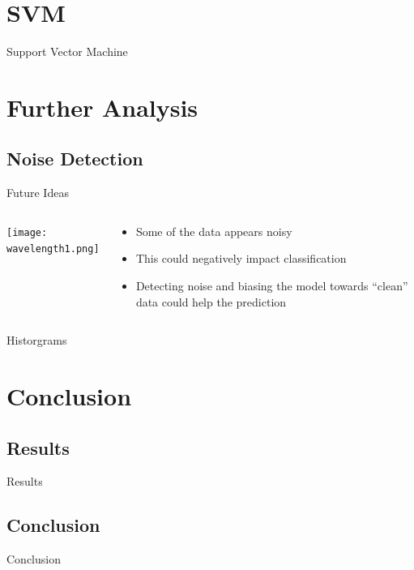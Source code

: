 \documentclass[11pt]{beamer}
\begin{document}

\section{SVM}
\begin{frame}{Support Vector Machine}

\end{frame}

\section{Further Analysis}
\subsection{Noise Detection}
\begin{frame}{Future Ideas}
\begin{columns}[T]
\begin{column}{.48\textwidth}
\texttt{[image: wavelength1.png]}
\end{column}
\hfill
\begin{column}{.48\textwidth}
\begin{itemize}
\item Some of the data appears noisy
\item This could negatively impact classification
\item Detecting noise and biasing the model towards ``clean'' data could help the prediction
\end{itemize}
\end{column}
\end{columns}
\end{frame}

\begin{frame}{Historgrams}
\begin{center}
\end{center}
\end{frame}

\section{Conclusion}
\subsection{Results}
\begin{frame}{Results}

\end{frame}

\subsection{Conclusion}
\begin{frame}{Conclusion}

\end{frame}
\end{document}
